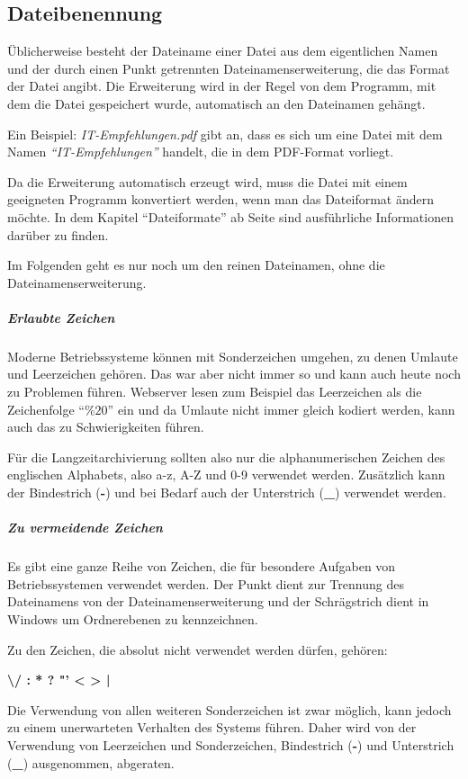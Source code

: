 \label{dateibenennung}
\subsection{Dateibenennung}
Üblicherweise besteht der Dateiname einer Datei aus dem eigentlichen Namen und der durch einen Punkt getrennten Dateinamenserweiterung, die das Format der Datei angibt. Die Erweiterung wird in der Regel von dem Programm, mit dem die Datei gespeichert wurde, automatisch an den Dateinamen gehängt.

Ein Beispiel: \emph{IT-Empfehlungen.pdf} gibt an, dass es sich um eine Datei mit dem Namen \emph{"`IT-Empfehlungen"'} handelt, die in dem PDF-Format vorliegt.

Da die Erweiterung automatisch erzeugt wird, muss die Datei mit einem geeigneten Programm konvertiert werden, wenn man das Dateiformat ändern möchte. In dem Kapitel "`Dateiformate"' ab Seite \pageref{dateiformate} sind ausführliche Informationen darüber zu finden.

Im Folgenden geht es nur noch um den reinen Dateinamen, ohne die Dateinamenserweiterung.

\subparagraph{Erlaubte Zeichen} Moderne Betriebssysteme können mit Sonderzeichen umgehen, zu denen Umlaute und Leerzeichen gehören. Das war aber nicht immer so und kann auch heute noch zu Problemen führen. Webserver lesen zum Beispiel das Leerzeichen als die Zeichenfolge "`$\%20$"' ein und da Umlaute nicht immer gleich kodiert werden, kann auch das zu Schwierigkeiten führen. 

Für die Langzeitarchivierung sollten also nur die alphanumerischen Zeichen des englischen Alphabets, also a-z, A-Z und 0-9 verwendet werden. Zusätzlich kann der Bindestrich ({\bfseries -}) und bei Bedarf auch der Unterstrich ({\bfseries\_}) verwendet werden.

\subparagraph{Zu vermeidende Zeichen} Es gibt eine ganze Reihe von Zeichen, die für besondere Aufgaben von Betriebssystemen verwendet werden. Der Punkt dient zur Trennung des Dateinamens von der Dateinamenserweiterung und der Schrägstrich dient in Windows um Ordnerebenen zu kennzeichnen.

Zu den Zeichen, die absolut nicht verwendet werden dürfen, gehören:
\begin{center}
	\Large \bfseries \textbackslash	 / : * ? "'	< >	|
\end{center}

Die Verwendung von allen weiteren Sonderzeichen ist zwar möglich, kann jedoch zu einem unerwarteten Verhalten des Systems führen. Daher wird von der Verwendung von Leerzeichen und Sonderzeichen, Bindestrich ({\bfseries -}) und Unterstrich ({\bfseries\_}) ausgenommen, abgeraten.

